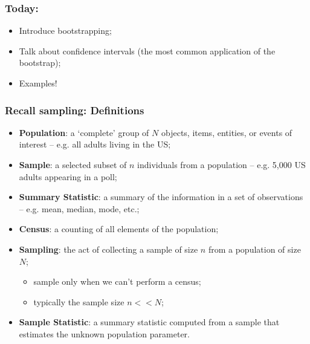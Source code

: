 \documentclass[aspectratio=169]{beamer}
\theoremstyle{principle}
\begin{document}
\begin{frame}
\frametitle{Today:}

\begin{itemize}
\item Introduce bootstrapping;
\bigskip
\bigskip
\bigskip

\item Talk about confidence intervals (the most common application of the bootstrap);
\bigskip
\bigskip
\bigskip

\item Examples!


\end{itemize}

\end{frame}

\begin{frame}
\frametitle{Recall sampling: Definitions}
\begin{itemize}
\item \textbf{Population}: a `complete' group of $N$ objects, items, entities, or events of interest -- e.g. all adults living in the US;
\bigskip
\item \textbf{Sample}: a selected subset of $n$ individuals from a population -- e.g. 5,000 US adults appearing in a poll;
\bigskip
\item \textbf{Summary Statistic}: a summary of the information in a set of observations -- e.g. mean, median, mode, etc.;
\bigskip
\item \textbf{Census}: a counting of all elements of the population;
\bigskip
\item \textbf{Sampling}: the act of collecting a sample of size $n$ from a population of size $N$;
\begin{itemize} 
\item sample only when we can’t perform a census;
\item typically the sample size $n<<N$;
\end{itemize}
\bigskip
\item \textbf{Sample Statistic}: a summary statistic computed from a sample that estimates the unknown population parameter.
\end{itemize}
\end{frame}
\end{document}
